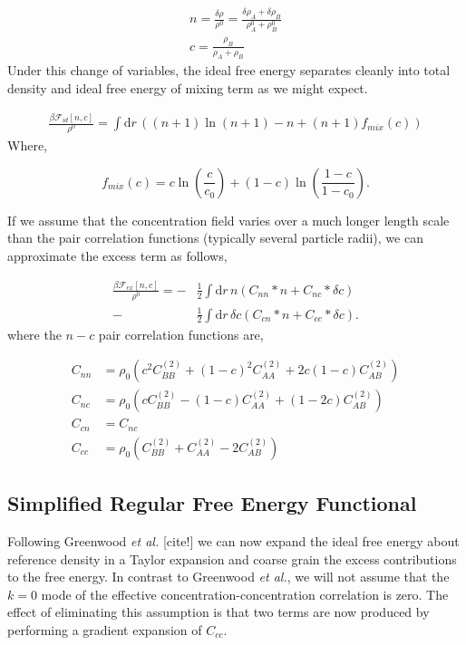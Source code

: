 \documentclass[showkeys, prb, reprint]{revtex4-1}
\newcommand{\F}{\mathcal{F}}
\newcommand{\A}{\rho_A}
\newcommand{\B}{\rho_B}
\newcommand{\dd}{\mathrm{d}}
\renewcommand{\d}{\delta}
\renewcommand{\l}{\left}
\renewcommand{\r}{\right}
\newcommand{\f}{\frac}
\begin{document}
\begin{gather}
	n = \f{\delta \rho}{\rho^0} = \f{\d \A + \d \B}{\A^0 + \B^0} \\
	c = \f{\B}{\A + \B}
\end{gather}
Under this change of variables, the ideal free energy separates cleanly into total density and ideal free energy of mixing term as we might expect.

\begin{gather}
	\f{\beta\F_{id}[n, c]}{\rho^0} = \int \dd r\, \l( \l(n + 1\r) \ln\l(n + 1\r) - n  
	 + \l(n + 1 \r) f_{mix}(c) \r)
\end{gather}
Where,

\begin{equation}
  f_{mix}(c) = c\ln\l(\f{c}{c_0}\r) + (1 - c)\ln\l(\f{1 - c}{1 - c_0}\r).
\end{equation}

If we assume that the concentration field varies over a much longer length scale than the pair correlation functions (typically several particle radii), we can approximate the excess term as follows,

\begin{align}
	\f{\beta \F_{ex}[n, c]}{\rho^0} = -&\f{1}{2} \int \dd r\, n \l( C_{nn} \ast n + C_{nc} \ast \d c\r) \nonumber \\
	- &\f{1}{2} \int\dd r\, \d c \l( C_{cn} \ast n + C_{cc} \ast \d c\r).
\end{align}
where the $n-c$ pair correlation functions are,

\begin{align}
	C_{nn} &= \rho_0 \l(c^2 C_{BB}^{(2)} + (1 - c)^2 C_{AA}^{(2)} + 2c\l(1 - c\r) C_{AB}^{(2)} \r) \\
	C_{nc} &= \rho_0 \l(c C_{BB}^{(2)} - (1-c)C_{AA}^{(2)} + (1 - 2c) C_{AB}^{(2)} \r)\\
	C_{cn} &= C_{nc} \\
	C_{cc} &= \rho_0 \l(C_{BB}^{(2)} + C_{AA}^{(2)} - 2C_{AB}^{(2)} \r)
\end{align}

\subsection{Simplified Regular Free Energy Functional}

Following Greenwood \textit{et al.} [cite!] we can now expand the ideal free energy about reference density in a Taylor expansion and coarse grain the excess contributions to the free energy. In contrast to Greenwood \textit{et al.}, we will not assume that the $k = 0$ mode of the effective concentration-concentration correlation is zero. The effect of eliminating this assumption is that two terms are now produced by performing a gradient expansion of $C_{cc}$.
\end{document}
